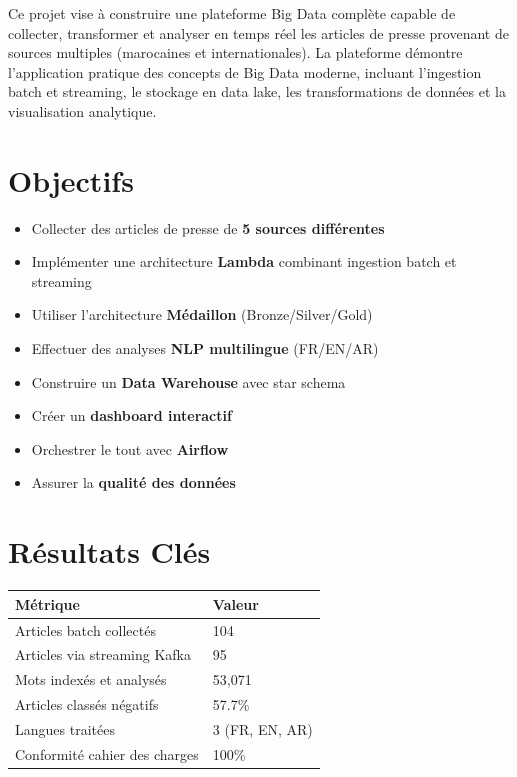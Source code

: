 \documentclass[12pt,a4paper]{report}
\begin{document}
Ce projet vise à construire une plateforme Big Data complète capable de collecter, transformer et analyser en temps réel les articles de presse provenant de sources multiples (marocaines et internationales). La plateforme démontre l'application pratique des concepts de Big Data moderne, incluant l'ingestion batch et streaming, le stockage en data lake, les transformations de données et la visualisation analytique.

\section*{Objectifs}

\begin{itemize}
    \item Collecter des articles de presse de \textbf{5 sources différentes}
    \item Implémenter une architecture \textbf{Lambda} combinant ingestion batch et streaming
    \item Utiliser l'architecture \textbf{Médaillon} (Bronze/Silver/Gold)
    \item Effectuer des analyses \textbf{NLP multilingue} (FR/EN/AR)
    \item Construire un \textbf{Data Warehouse} avec star schema
    \item Créer un \textbf{dashboard interactif}
    \item Orchestrer le tout avec \textbf{Airflow}
    \item Assurer la \textbf{qualité des données}
\end{itemize}

\section*{Résultats Clés}

\begin{table}[H]
    \centering
    \begin{tabular}{ll}
        \toprule
        \textbf{Métrique}             & \textbf{Valeur} \\
        \midrule
        Articles batch collectés      & 104             \\
        Articles via streaming Kafka  & 95              \\
        Mots indexés et analysés      & 53,071          \\
        Articles classés négatifs     & 57.7\%          \\
        Langues traitées              & 3 (FR, EN, AR)  \\
        Conformité cahier des charges & 100\%           \\
        \bottomrule
    \end{tabular}
\end{table}
\end{document}
